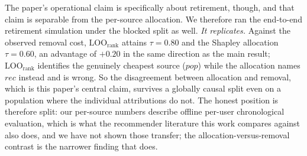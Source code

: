 \documentclass[pdflatex,sn-basic,Numbered]{sn-jnl}
\theoremstyle{plain}
\theoremstyle{definition}
\newcommand{\LOOr}{\mathrm{LOO}_{\mathrm{rank}}}
\begin{document}
The paper's operational claim is specifically about retirement, though, and
that claim is separable from the per-source allocation. We therefore ran the
end-to-end retirement simulation under the blocked split as well. \emph{It
replicates.} Against the observed removal cost, $\LOOr$ attains
$\tau = 0.80$ and the Shapley allocation $\tau = 0.60$, an advantage of
$+0.20$ in the same direction as the main result; $\LOOr$ identifies the
genuinely cheapest source ($pop$) while the allocation names $rec$ instead and
is wrong. So the disagreement between allocation and removal, which is this
paper's central claim, survives a globally causal split even on a population
where the individual attributions do not. The honest position is therefore
split: our per-source numbers describe offline per-user chronological
evaluation, which is what the recommender literature this work compares
against also does, and we have not shown those transfer; the
allocation-versus-removal contrast is the narrower finding that does.
\end{document}
